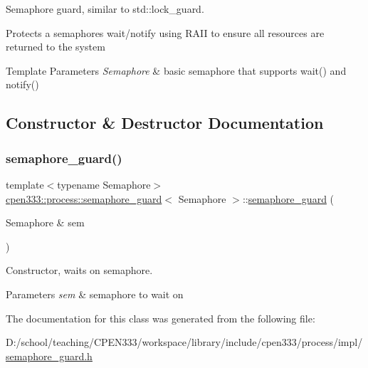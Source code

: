 Semaphore guard, similar to std\+::lock\+\_\+guard. 

Protects a semaphore\textquotesingle{}s wait/notify using R\+A\+II to ensure all resources are returned to the system 
\begin{DoxyTemplParams}{Template Parameters}
{\em Semaphore} & basic semaphore that supports wait() and notify() \\
\hline
\end{DoxyTemplParams}


\subsection{Constructor \& Destructor Documentation}
\mbox{\label{classcpen333_1_1process_1_1semaphore__guard_aa816ac26e4894b1945724944e7965968}} 
\subsubsection{\texorpdfstring{semaphore\+\_\+guard()}{semaphore\_guard()}}
{\footnotesize\ttfamily template$<$typename Semaphore$>$ \\
\hyperlink{classcpen333_1_1process_1_1semaphore__guard}{cpen333\+::process\+::semaphore\+\_\+guard}$<$ Semaphore $>$\+::\hyperlink{classcpen333_1_1process_1_1semaphore__guard}{semaphore\+\_\+guard} (\begin{DoxyParamCaption}\item[{Semaphore \&}]{sem }\end{DoxyParamCaption})\hspace{0.3cm}{\ttfamily [inline]}}



Constructor, waits on semaphore. 


\begin{DoxyParams}{Parameters}
{\em sem} & semaphore to wait on \\
\hline
\end{DoxyParams}


The documentation for this class was generated from the following file\+:\begin{DoxyCompactItemize}
\item 
D\+:/school/teaching/\+C\+P\+E\+N333/workspace/library/include/cpen333/process/impl/\hyperlink{semaphore__guard_8h}{semaphore\+\_\+guard.\+h}\end{DoxyCompactItemize}
